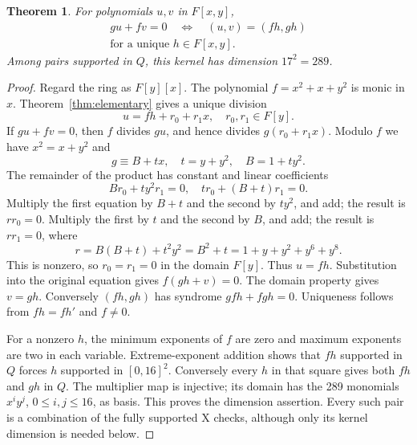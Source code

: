 \documentclass{article}
\newtheorem{theorem}{Theorem}
\begin{document}
\begin{theorem}\label{thm:bulk}
  For polynomials \(u, v\) in \(F[x,y]\),
  \begin{equation}
    \begin{gathered}
      gu + fv = 0 \quad \Longleftrightarrow \quad (u,v) = (fh, gh) \\
      \text{for a unique } h \in F[x,y].
    \end{gathered}
  \end{equation}
  Among pairs supported in \(Q\), this kernel has dimension \(17^2 = 289\).
\end{theorem}

\begin{proof}
  Regard the ring as \(F[y][x]\). The polynomial
  \(f = x^2 + x + y^2\) is monic in \(x\). Theorem~\ref{thm:elementary} gives a unique division
  \begin{equation}
    u = fh + r_0 + r_1 x, \quad r_0, r_1 \in F[y].
  \end{equation}
  If \(gu + fv = 0\), then \(f\) divides \(gu\), and hence divides
  \(g(r_0 + r_1 x)\). Modulo \(f\) we have \(x^2 = x + y^2\) and
  \begin{equation}
    g \equiv B + tx, \quad t = y + y^2, \quad B = 1 + t y^2.
  \end{equation}
  The remainder of the product has constant and linear coefficients
  \begin{equation}
    B r_0 + t y^2 r_1 = 0, \quad
    t r_0 + (B + t) r_1 = 0.
  \end{equation}
  Multiply the first equation by \(B + t\) and the second by \(t y^2\),
  and add; the result is \(r r_0 = 0\). Multiply the first by \(t\) and the
  second by \(B\), and add; the result is \(r r_1 = 0\), where
  \begin{equation}
    r = B(B + t) + t^2 y^2 = B^2 + t = 1 + y + y^2 + y^6 + y^8.
  \end{equation}
  This is nonzero, so \(r_0 = r_1 = 0\) in the domain \(F[y]\).
  Thus \(u = fh\). Substitution into the original equation gives
  \(f(gh + v) = 0\). The domain property gives \(v = gh\).
  Conversely \((fh, gh)\) has syndrome \(gfh + fgh = 0\).
  Uniqueness follows from \(fh = fh'\) and \(f \ne 0\).

  For a nonzero \(h\), the minimum exponents of \(f\) are zero and maximum
  exponents are two in each variable. Extreme-exponent addition shows that
  \(fh\) supported in \(Q\) forces \(h\) supported in \([0,16]^2\).
  Conversely every \(h\) in that square gives both \(fh\) and \(gh\) in \(Q\).
  The multiplier map is injective; its domain has the 289 monomials
  \(x^i y^j\), \(0 \le i, j \le 16\), as basis.
  This proves the dimension assertion. Every such pair is a combination
  of the fully supported X checks, although only its kernel dimension is
  needed below.
\end{proof}
\end{document}
